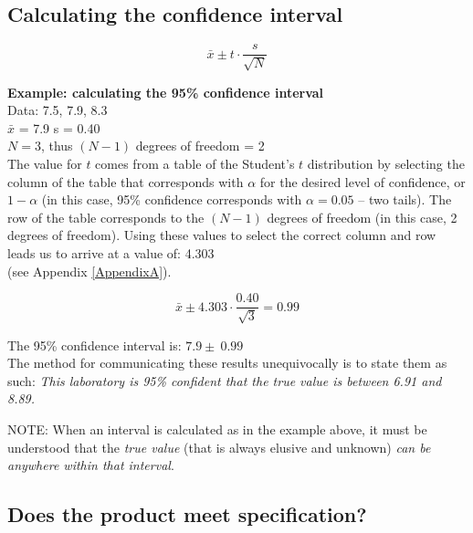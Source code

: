 \subsection{Calculating the confidence interval}
\begin{center}
\begin{equation}
\bar{x} \pm t \cdot \frac{s}{\sqrt{N}}
\end{equation}
\end{center}

\textbf{Example: calculating the 95\% confidence interval}\\

Data: 7.5, 7.9, 8.3\\

$ \bar{x} $ = 7.9  s = 0.40\\

$ N = 3$, thus $(N-1)$ degrees of freedom = 2 \\

The value for $ t $ comes from a table of the Student’s $ t $ distribution by selecting the column of the table that corresponds with $ \alpha $ for the desired level of confidence, or $1-\alpha$ (in this case, 95\% confidence corresponds with $ \alpha = 0.05 $ -- two tails).  The row of the table corresponds to the $(N-1)$ degrees of freedom (in this case, 2 degrees of freedom). Using these values to select the correct column and row leads us to arrive at a value of: 4.303\\  (see Appendix \ref{AppendixA}).

\begin{center}
\begin{equation}
\bar{x} \pm 4.303 \cdot \frac{0.40}{\sqrt{3}}  =0.99
\end{equation}

\end{center}
The 95\% confidence interval is: $ 7.9 \pm \ 0.99 $\\

The method for communicating these results unequivocally is to state them as such: \textit{This laboratory is 95\% confident that the true value is between 6.91 and 8.89.}

NOTE: When an interval is calculated as in the example above, it must be understood that the \textit{true value} (that is always elusive and unknown) \textit{can be anywhere within that interval}.

\subsection{Does the product meet specification?}

